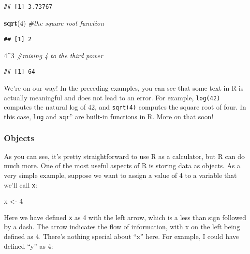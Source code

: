 \documentclass[
]{book}
\newenvironment{Shaded}{\begin{snugshade}}{\end{snugshade}}
\newcommand{\CommentTok}[1]{\textcolor[rgb]{0.56,0.35,0.01}{\textit{#1}}}
\newcommand{\DecValTok}[1]{\textcolor[rgb]{0.00,0.00,0.81}{#1}}
\newcommand{\FunctionTok}[1]{\textcolor[rgb]{0.13,0.29,0.53}{\textbf{#1}}}
\newcommand{\NormalTok}[1]{#1}
\newcommand{\OtherTok}[1]{\textcolor[rgb]{0.56,0.35,0.01}{#1}}
\newcommand{\SpecialCharTok}[1]{\textcolor[rgb]{0.81,0.36,0.00}{\textbf{#1}}}
\begin{document}
\begin{verbatim}
## [1] 3.73767
\end{verbatim}

\begin{Shaded}
\begin{Highlighting}[]
\FunctionTok{sqrt}\NormalTok{(}\DecValTok{4}\NormalTok{) }\CommentTok{\#the square root function}
\end{Highlighting}
\end{Shaded}

\begin{verbatim}
## [1] 2
\end{verbatim}

\begin{Shaded}
\begin{Highlighting}[]
\DecValTok{4}\SpecialCharTok{\^{}}\DecValTok{3} \CommentTok{\#raising 4 to the third power}
\end{Highlighting}
\end{Shaded}

\begin{verbatim}
## [1] 64
\end{verbatim}

We're on our way! In the preceding examples, you can see that some text in R is actually meaningful and does not lead to an error. For example, \texttt{log(42)} computes the natural log of 42, and \texttt{sqrt(4)} computes the square root of four. In this case, \texttt{log} and \texttt{sqr}'' are built-in functions in R. More on that soon!

\subsubsection{Objects}\label{objects}

As you can see, it's pretty straightforward to use R as a calculator, but R can do much more. One of the most useful aspects of R is storing data as objects. As a very simple example, suppose we want to assign a value of 4 to a variable that we'll call \texttt{x}:

\begin{Shaded}
\begin{Highlighting}[]
\NormalTok{x }\OtherTok{\textless{}{-}} \DecValTok{4}
\end{Highlighting}
\end{Shaded}

Here we have defined \texttt{x} as 4 with the left arrow, which is a less than sign followed by a dash. The arrow indicates the flow of information, with x on the left being defined as 4. There's nothing special about ``x'' here. For example, I could have defined ``y'' as 4:
\end{document}
